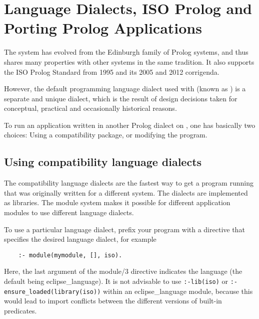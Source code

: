 %
%
%
%
%
%
%

\chapter{Language Dialects, ISO Prolog and Porting Prolog Applications}
\label{chapporting}

The {\eclipse} system has evolved from the Edinburgh family of
Prolog systems, and thus shares many properties with other systems
in the same tradition.  It also supports the
ISO Prolog Standard from 1995 and its 2005 and 2012 corrigenda.

However, the default programming language dialect used with {\eclipse}
(known as ) is a separate and unique dialect,
which is the result of design decisions taken for conceptual, practical
and occasionally historical reasons.

To run an application written in another Prolog dialect on {\eclipse},
one has basically two choices:
Using a compatibility package, or modifying the program.


\section{Using compatibility language dialects}
The {\eclipse} compatibility language dialects are the fastest way to get a
program running that was originally written for a different system.
The dialects are implemented as libraries.
The module system makes it possible for different application
modules to use different language dialects.

To use a particular language dialect, prefix your program with a
directive that specifies the desired language dialect, for example
\begin{verbatim}
    :- module(mymodule, [], iso).
\end{verbatim}
Here, the last argument of the module/3 directive indicates the language
(the default being eclipse_language).
It is not advisable to use \verb.:-lib(iso). or \verb.:-ensure_loaded(library(iso)).
within an eclipse_language module, because this would lead to import
conflicts between the different versions of built-in predicates.

